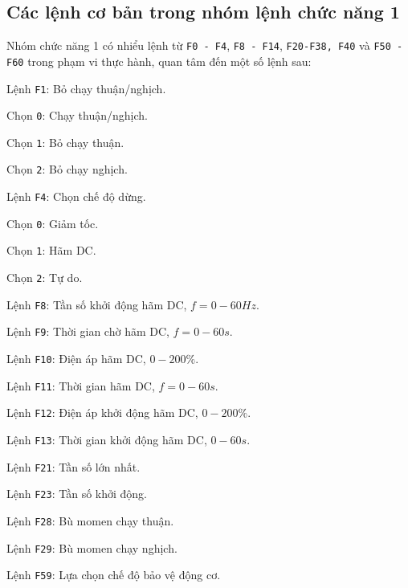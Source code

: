 \documentclass[13pt,a4paper]{extarticle}
\begin{document}
\subsection{Các lệnh cơ bản trong nhóm lệnh chức năng 1}
Nhóm chức năng 1 có nhiểu lệnh từ \verb|F0 - F4|,  \verb|F8 - F14|, \verb|F20-F38, F40| và \verb|F50 - F60| trong phạm vi thực hành, quan tâm đến một số lệnh sau:
\begin{list}{}{}
\item Lệnh \verb|F1|: Bỏ chạy thuận/nghịch.
\begin{list}{+}{}
\begin{multicols}{2}
\item Chọn \verb|0|: Chạy thuận/nghịch.
\item Chọn \verb|1|: Bỏ chạy thuận.
\item Chọn \verb|2|: Bỏ chạy nghịch.
\end{multicols}
\end{list}
\item Lệnh \verb|F4|: Chọn chế độ dừng.
\begin{list}{+}{}
\begin{multicols}{2}
\item Chọn \verb|0|: Giảm tốc.
\item Chọn \verb|1|: Hãm DC.
\item Chọn \verb|2|: Tự do.
\end{multicols}
\end{list}
\item Lệnh \verb|F8|: Tần số khởi động hãm DC, $f = 0 - 60Hz$.
\item Lệnh \verb|F9|: Thời gian chờ hãm DC, $f = 0 - 60s$.
\item Lệnh \verb|F10|: Điện áp hãm DC, $0 - 200\%$.
\item Lệnh \verb|F11|: Thời gian hãm DC, $f = 0 - 60s$.
\item Lệnh \verb|F12|: Điện áp khởi động hãm DC, $0 - 200\%$.
\item Lệnh \verb|F13|: Thời gian khởi động hãm DC, $0 - 60s$.
\item Lệnh \verb|F21|: Tần số lớn nhất.
\item Lệnh \verb|F23|: Tần số khởi động.
\item Lệnh \verb|F28|: Bù momen chạy thuận.
\item Lệnh \verb|F29|: Bù momen chạy nghịch.
\item Lệnh \verb|F59|: Lựa chọn chế độ bảo vệ động cơ.
\begin{list}{+}{}
\begin{multicols}{2}

\end{multicols}
\end{list}
\end{list}
\end{document}
